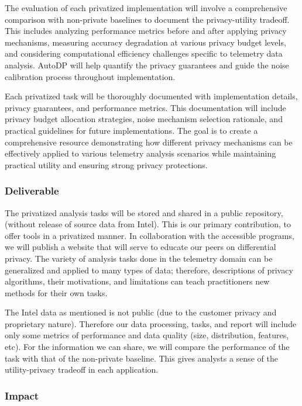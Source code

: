 \documentclass[12pt,letterpaper]{article}
\begin{document}
{The evaluation of each privatized implementation will involve a comprehensive comparison with non-private baselines to document the privacy-utility tradeoff. This includes analyzing performance metrics before and after applying privacy mechanisms, measuring accuracy degradation at various privacy budget levels, and considering computational efficiency challenges specific to telemetry data analysis. AutoDP will help quantify the privacy guarantees and guide the noise calibration process throughout implementation. 

Each privatized task will be thoroughly documented with implementation details, privacy guarantees, and performance metrics. This documentation will include privacy budget allocation strategies, noise mechanism selection rationale, and practical guidelines for future implementations. The goal is to create a comprehensive resource demonstrating how different privacy mechanisms can be effectively applied to various telemetry analysis scenarios while maintaining practical utility and ensuring strong privacy protections.


\subsubsection{Deliverable}

The privatized analysis tasks will be stored and shared in a public repository, (without release of source data from Intel). This is our primary contribution, to offer tools in a privatized manner. In collaboration with the accessible programs, we will publish a website that will serve to educate our peers on differential privacy. The variety of analysis tasks done in the telemetry domain can be generalized and applied to many types of data; therefore, descriptions of privacy algorithms, their motivations, and limitations can teach practitioners new methods for their own tasks. 

The Intel data as mentioned is not public (due to the customer privacy and proprietary nature). Therefore our data processing, tasks, and report will include only some metrics of performance and data quality (size, distribution, features, etc). For the information we can share, we will compare the performance of the task with that of the non-private baseline. This gives analysts a sense of the utility-privacy tradeoff in each application. 

\subsubsection{Impact}

}
\end{document}
